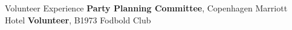 \begin{rubric}{\faHandHoldingHeart Volunteer Experience}
\entry*[2025 -- now] \textbf{Party Planning Committee}, Copenhagen Marriott Hotel
%
\entry*[2025 -- now] \textbf{Volunteer}, B1973 Fodbold Club
%
\end{rubric}